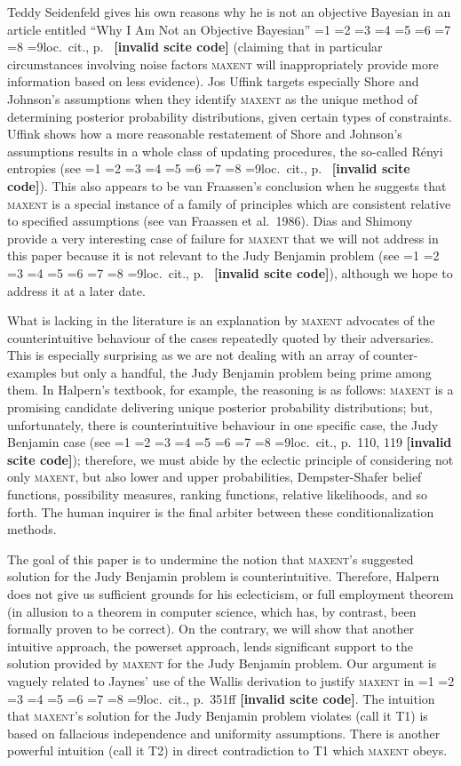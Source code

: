 \documentclass[12pt]{article}
\newcommand{\nonsc}[1]{}
\newcommand{\qeins}[1]{``#1''}
\newif\ifNumericalOrYear
\newcommand{\PageP}{p.~}
\newcommand{\PageP}{}
\newcommand{\scite}[3]{\ifnum#1=1\ifNumericalOrYear\citep{#2}\else\citeyearpar{#2}\fi\else
\ifnum#1=2\ifNumericalOrYear\citep[#3]{#2}\else\citep[{\PageP}#3]{#2}\fi\else
\ifnum#1=3\ifNumericalOrYear(\citet[#3]{#2})\else\citep[{\PageP}#3]{#2}\fi\else
\ifnum#1=4\ifNumericalOrYear\citet{#2}\else\citet{#2}\fi\else
\ifnum#1=5\ifNumericalOrYear(\citet{#2})\else\citep{#2}\fi\else
\ifnum#1=6\ifNumericalOrYear(\citet[#3]{#2})\else\citep[{\PageP}#3]{#2}\fi\else
\ifnum#1=7\ifNumericalOrYear\citep{#2}\else\citealp{#2}\fi\else
\ifnum#1=8\ifNumericalOrYear\citep[#3]{#2}\else\citealp[{\PageP}#3]{#2}\fi\else
\ifnum#1=9\ifNumericalOrYear\citep[#3]{#2}\else{}loc.\ cit., {\PageP}#3\fi\else
\textbf{[invalid scite code]}\fi\fi\fi\fi\fi\fi\fi\fi\fi}
\begin{document}
Teddy Seidenfeld gives his own reasons why he is not an objective
Bayesian in an article entitled \qeins{Why I Am Not an Objective
  Bayesian} \scite{1}{seidenfeld79}{} (claiming that in particular
circumstances involving noise factors \textsc{maxent} will
inappropriately provide more information based on less evidence). Jos
Uffink targets especially Shore and Johnson's assumptions when they
identify \textsc{maxent} as the unique method of determining posterior
probability distributions, given certain types of constraints. Uffink
shows how a more reasonable restatement of Shore and Johnson's
assumptions results in a whole class of updating procedures, the
so-called R{\'e}nyi entropies (see \scite{7}{uffink95}{}). This also
appears to be van Fraassen's conclusion when he suggests that
\textsc{maxent} is a special instance of a family of principles which
are consistent relative to specified assumptions (see van Fraassen et
al.\ 1986)\nonsc{}. Dias and Shimony provide a very interesting case of
failure for \textsc{maxent} that we will not address in this paper
because it is not relevant to the Judy Benjamin problem (see
\scite{7}{diasshimony81}{}), although we hope to address it at a later
date.

What is lacking in the literature is an explanation by \textsc{maxent}
advocates of the counterintuitive behaviour of the cases repeatedly
quoted by their adversaries. This is especially surprising as we are
not dealing with an array of counter-examples but only a handful, the
Judy Benjamin problem being prime among them. In Halpern's textbook,
for example, the reasoning is as follows: \textsc{maxent} is a
promising candidate delivering unique posterior probability
distributions; but, unfortunately, there is counterintuitive
behaviour in one specific case, the Judy Benjamin case (see
\scite{8}{halpern03}{110, 119}); therefore, we must abide by the eclectic
principle of considering not only \textsc{maxent}, but also lower and
upper probabilities, Dempster-Shafer belief functions, possibility
measures, ranking functions, relative likelihoods, and so forth. The
human inquirer is the final arbiter between these conditionalization
methods.

The goal of this paper is to undermine the notion that
\textsc{maxent}'s suggested solution for the Judy Benjamin problem is
counterintuitive. Therefore, Halpern does not give us sufficient
grounds for his eclecticism, or full employment theorem (in allusion
to a theorem in computer science, which has, by contrast, been
formally proven to be correct). On the contrary, we will show that
another intuitive approach, the powerset approach, lends significant
support to the solution provided by \textsc{maxent} for the Judy
Benjamin problem. Our argument is vaguely related to Jaynes' use of
the Wallis derivation to justify \textsc{maxent} in
\scite{8}{jaynes98}{351ff}. The intuition that \textsc{maxent}'s
solution for the Judy Benjamin problem violates (call it T1) is based
on fallacious independence and uniformity assumptions. There is
another powerful intuition (call it T2) in direct contradiction to T1
which \textsc{maxent} obeys.
\end{document}
